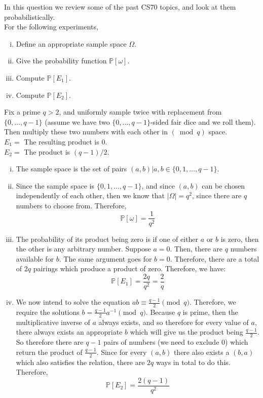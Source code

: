 \documentclass[11pt]{article}
\begin{document}
\pagebreak
{}
In this question we review some of the past CS70 topics, and look at them probabilistically.\\
For the following experiments,
\begin{enumerate}[i.]
\item Define an appropriate sample space $\Omega$.
\item Give the probability function $\mathbb P[\omega]$.
\item Compute $\mathbb P[E_1]$.
\item Compute $\mathbb P[E_2]$.
\end{enumerate}
\begin{Parts}
    \Part Fix a prime $q>2$, and uniformly sample twice with replacement from
    $\{0, \dots, q-1\}$ (assume we have two $\{0, \dots, q-1\}$-sided fair dice and we roll them). Then multiply these two numbers with each other in
    $(\bmod{q})$ space.\\
    $E_1 =$ The resulting product is $0$.\\
    $E_2 =$ The product is $(q-1)/2$.

    \begin{solution}
      \begin{enumerate}[i.]
        \item The sample space is the set of pairs $(a, b) | a, b \in \{0, 1, \dots, q-1\}$. 
        \item Since the sample space is $\{0, 1, \dots, q-1\}$, and since $(a, b)$ can be chosen independently of each other, then we know that $|\Omega| = q^2$, since there are $q$ numbers to choose from. Therefore, 
        \[ \mathbb P[\omega] = \frac{1}{q^2}\]
        \item The probability of its product being zero is if one of either $a$ or $b$ is zero, then the other is any arbitrary number. Suppose $a = 0$. Then, there are $q$ numbers available for $b$. The same argument goes for $b = 0$. Therefore, there are a total of $2q$ pairings which produce a product of zero. Therefore, we have: 
        \[ \mathbb P[E_1] = \frac{2q}{q^2} = \frac{2}{q}\]
        \item We now intend to solve the equation $ab \equiv \frac{q-1}{2} \pmod q$. Therefore, we require the solutions $b = \frac{q-1}{2} a^{-1} \pmod q$. Because $q$ is prime, then the multiplicative inverse of $a$ always exists, and so therefore for every value of $a$, there always exists an appropriate $b$ which will give us the product being $\frac{q-1}{2}$. So therefore there are $q-1$ pairs of numbers (we need to exclude 0) which return the product of $\frac{q-1}{2}$. Since for every $(a, b)$ there also exists a $(b, a)$ which also satisfies the relation, there are $2q$ ways in total to do this. Therefore, 
        \[ \mathbb P[E_2] = \frac{2(q-1)}{q^2}\]
      \end{enumerate}
    \end{solution}


\end{Parts}
\end{document}
